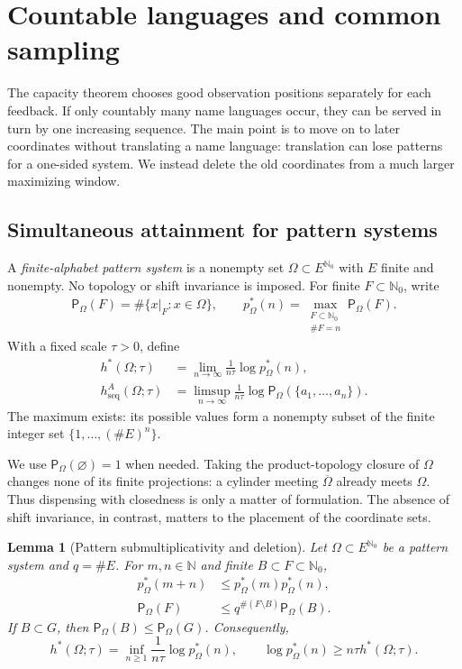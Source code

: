 \documentclass[11pt,reqno]{amsart}
\numberwithin{equation}{section}
\newtheorem{lemma}[theorem]{Lemma}
\theoremstyle{definition}
\theoremstyle{definition}
\newcommand{\N}{\mathbb N}
\newcommand{\Nzero}{\mathbb N_0}
\newcommand{\Patt}{\mathsf P}
\newcommand{\hseq}{h_{\mathrm{seq}}}
\newcommand{\hpat}{h^{*}}
\begin{document}
\section{Countable languages and common sampling}\label{sec:comb}

The capacity theorem chooses good observation positions separately
for each feedback. If only countably many name languages occur, they
can be served in turn by one increasing sequence. The main point is
to move on to later coordinates without translating a name language:
translation can lose patterns for a one-sided system. We instead
delete the old coordinates from a much larger maximizing window.

\subsection{Simultaneous attainment for pattern systems}

A \emph{finite-alphabet pattern system} is a nonempty set
$\Omega\subset E^{\Nzero}$ with $E$ finite and nonempty.  No topology or
shift invariance is imposed.  For finite $F\subset\Nzero$, write
\begin{align*}
 \Patt_\Omega(F)=\#\{x|_F:x\in\Omega\},
 \qquad
 p_\Omega^*(n)=
 \max_{\substack{F\subset\Nzero\\\#F=n}}\Patt_\Omega(F).
\end{align*}
With a fixed scale $\tau>0$, define
\begin{align*}
 \hpat(\Omega;\tau)&=\lim_{n\to\infty}
       \frac1{n\tau}\log p_\Omega^*(n),\\
 \hseq^A(\Omega;\tau)&=\limsup_{n\to\infty}
       \frac1{n\tau}\log
       \Patt_\Omega(\{a_1,\ldots,a_n\}).
\end{align*}
The maximum exists: its possible values form a nonempty subset of the finite
integer set $\{1,\ldots,(\#E)^n\}$.

We use $\Patt_\Omega(\varnothing)=1$ when needed.
Taking the product-topology closure of $\Omega$ changes none of its
finite projections: a cylinder meeting $\overline\Omega$ already meets
$\Omega$. Thus dispensing with closedness is only a matter of
formulation. The absence of shift invariance, in contrast, matters to the
placement of the coordinate sets.

\begin{lemma}[Pattern submultiplicativity and deletion]\label{lem:pattern-submult}
Let $\Omega\subset E^{\Nzero}$ be a pattern system and $q=\#E$.
For $m,n\in\N$ and finite $B\subset F\subset\Nzero$,
\begin{align}
 p_\Omega^*(m+n)&\le p_\Omega^*(m)p_\Omega^*(n),
 \label{eq:pattern-submult}\\
 \Patt_\Omega(F)&\le q^{\#(F\setminus B)}\Patt_\Omega(B).
 \label{eq:deletion} 
\end{align}
If $B\subset G$, then $\Patt_\Omega(B)\le\Patt_\Omega(G)$.
Consequently,
\begin{equation}\label{eq:fekete-pstar}
 \hpat(\Omega;\tau)
 =\inf_{n\ge1}\frac1{n\tau}\log p_\Omega^*(n),
 \qquad
 \log p_\Omega^*(n)\ge n\tau\hpat(\Omega;\tau).
\end{equation}
\end{lemma}
\end{document}
